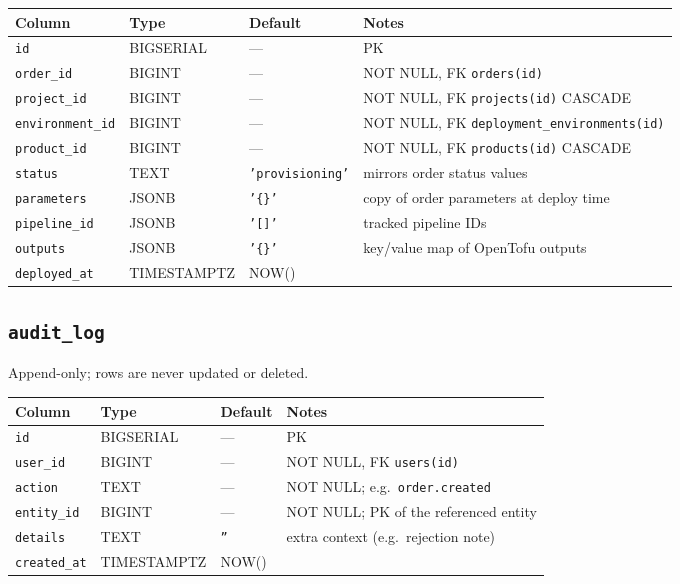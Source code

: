 \documentclass[12pt,a4paper,twoside]{report}
\newcommand{\code}[1]{\texttt{#1}}
\begin{document}
\begin{table}[H]
  \centering\small
  \begin{tabular}{@{}llll@{}}
    \toprule
    \textbf{Column} & \textbf{Type} & \textbf{Default} & \textbf{Notes} \\
    \midrule
    \code{id}             & BIGSERIAL   & ---         & PK \\
    \code{order\_id}      & BIGINT      & ---         & NOT NULL, FK \textrightarrow{} \code{orders(id)} \\
    \code{project\_id}    & BIGINT      & ---         & NOT NULL, FK \textrightarrow{} \code{projects(id)} CASCADE \\
    \code{environment\_id}& BIGINT      & ---         & NOT NULL, FK \textrightarrow{} \code{deployment\_environments(id)} \\
    \code{product\_id}    & BIGINT      & ---         & NOT NULL, FK \textrightarrow{} \code{products(id)} CASCADE \\
    \code{status}         & TEXT        & \code{'provisioning'} & mirrors order status values \\
    \code{parameters}     & JSONB       & \code{'\{\}'} & copy of order parameters at deploy time \\
    \code{pipeline\_id}   & JSONB       & \code{'[]'} & tracked pipeline IDs \\
    \code{outputs}        & JSONB       & \code{'\{\}'} & key/value map of OpenTofu outputs \\
    \code{deployed\_at}   & TIMESTAMPTZ & NOW()       & \\
    \bottomrule
  \end{tabular}
\end{table}

\subsection*{\texttt{audit\_log}}

Append-only; rows are never updated or deleted.

\begin{table}[H]
  \centering\small
  \begin{tabular}{@{}llll@{}}
    \toprule
    \textbf{Column} & \textbf{Type} & \textbf{Default} & \textbf{Notes} \\
    \midrule
    \code{id}         & BIGSERIAL   & ---       & PK \\
    \code{user\_id}   & BIGINT      & ---       & NOT NULL, FK \textrightarrow{} \code{users(id)} \\
    \code{action}     & TEXT        & ---       & NOT NULL; e.g.\ \code{order.created} \\
    \code{entity\_id} & BIGINT      & ---       & NOT NULL; PK of the referenced entity \\
    \code{details}    & TEXT        & \code{''} & extra context (e.g.\ rejection note) \\
    \code{created\_at}& TIMESTAMPTZ & NOW()     & \\
    \bottomrule
  \end{tabular}
\end{table}
\end{document}
